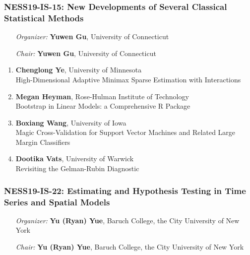 \subsubsection*{NESS19-IS-15: New Developments of Several Classical Statistical Methods}

\begin{enumerate}[align=left]
\item [\emph{Organizer:}] \textbf{Yuwen Gu}, University of Connecticut
\item [\emph{Chair:}] \textbf{Yuwen Gu}, University of Connecticut
\end{enumerate}

\begin{enumerate}
\item \textbf{Chenglong Ye}, University of Minnesota \\
High-Dimensional Adaptive Minimax Sparse Estimation with Interactions
\item \textbf{Megan Heyman}, Rose-Hulman Institute of Technology \\
Bootstrap in Linear Models:  a Comprehensive R Package
\item \textbf{Boxiang Wang}, University of Iowa \\
Magic Cross-Validation for Support Vector Machines and Related Large Margin Classifiers
\item \textbf{Dootika Vats}, University of Warwick \\
Revisiting the Gelman-Rubin Diagnostic
\end{enumerate}

\subsubsection*{NESS19-IS-22: Estimating and Hypothesis Testing in Time Series and Spatial Models}

\begin{enumerate}[align=left]
\item [\emph{Organizer:}] \textbf{Yu (Ryan) Yue}, Baruch College, the City University of New York
\item [\emph{Chair:}] \textbf{Yu (Ryan) Yue}, Baruch College, the City University of New York
\end{enumerate}

